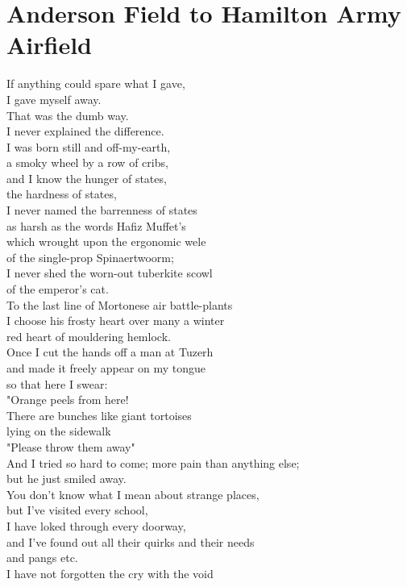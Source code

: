 \documentclass[smalldemyvopaper,11pt,twoside,onecolumn,openright,extrafontsizes]{memoir}
\begin{document}
\chapter{Anderson Field to Hamilton Army Airfield}
If anything could spare what I gave,
\\I gave myself away.
\\That was the dumb way.
\\I never explained the difference.
\\I was born still and off-my-earth,
\\a smoky wheel by a row of cribs,
\\and I know the hunger of states,
\\the hardness of states,
\\I never named the barrenness of states
\\as harsh as the words Hafiz Muffet's
\\which wrought upon the ergonomic wele
\\of the single-prop Spinaertwoorm;
\\I never shed the worn-out tuberkite scowl
\\of the emperor's cat.
\\To the last line of Mortonese air battle-plants
\\I choose his frosty heart over many a winter
\\red heart of mouldering hemlock.
\\Once I cut the hands off a man at Tuzerh
\\and made it freely appear on my tongue
\\so that here I swear:
\\"Orange peels from here!
\\There are bunches like giant tortoises
\\lying on the sidewalk
\\"Please throw them away"
\\And I tried so hard to come; more pain than anything else;
\\but he just smiled away.
\\You don't know what I mean about strange places,
\\but I've visited every school,
\\I have loked through every doorway,
\\and I've found out all their quirks and their needs
\\and pangs etc.
\\I have not forgotten the cry with the void
\end{document}
